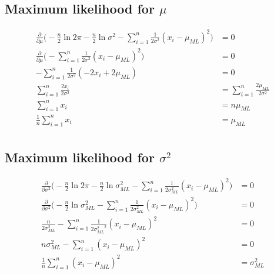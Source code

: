 \subsection{Maximum likelihood for $\mu$}\label{AP:mu_ML}
\begin{equation}\label{eq:ap_derivative_mu}
\begin{split}
    \frac{\partial }{\partial \mu } \big( - \frac{n}{2} \ln{2 \pi} - \frac{n}{2} \ln{\sigma ^2} - \sum_{i=1}^{n} \frac{1}{2\sigma ^2}(x_i - \mu_{ML})^2 \big) &= 0\\
    \frac{\partial}{\partial \mu} \big( - \sum_{i=1}^{n} \frac{1}{2\sigma ^2}(x_i - \mu_{ML})^2 \big) &= 0\\
    - \sum_{i=1}^{n} \frac{1}{2\sigma ^2}(-2 x_i + 2 \mu_{ML}) &= 0\\
    \sum_{i=1}^{n} \frac{2 x_i}{2\sigma ^2} &= \sum_{i=1}^{n} \frac{2 \mu_{ML}}{2\sigma ^2}\\
    \sum_{i=1}^{n} x_i &= n \mu_{ML}\\
    \frac{1}{n} \sum_{i=1}^{n} x_i &= \mu_{ML}\\
\end{split}
\end{equation}

\subsection{Maximum likelihood for $\sigma^2$}\label{AP:s2_ML}

\begin{equation}\label{eq:ap_derivative_sigma}
\begin{split}
    \frac{\partial }{\partial \sigma^2 } \big( - \frac{n}{2} \ln{2 \pi} - \frac{n}{2} \ln{\sigma^2_{ML}} - \sum_{i=1}^{n} \frac{1}{2\sigma^2_{ML}}(x_i - \mu_{ML})^2 \big) &= 0\\
    \frac{\partial}{\partial \sigma^2} \big( - \frac{n}{2} \ln{\sigma^2_{ML}}  - \sum_{i=1}^{n} \frac{1}{2\sigma^2_{ML}}(x_i - \mu_{ML})^2 \big) &= 0\\
    \frac{n}{2\sigma^2_{ML}} - \sum_{i=1}^{n} \frac{1}{2{\sigma^2_{ML}}^2}(x_i - \mu_{ML})^2 &= 0\\
    n\sigma^2_{ML} - \sum_{i=1}^{n} (x_i - \mu_{ML})^2 &= 0\\
    \frac{1}{n} \sum_{i=1}^{n} (x_i - \mu_{ML})^2 &= \sigma^2_{ML}\\
\end{split}
\end{equation}

